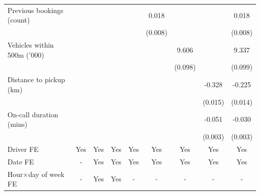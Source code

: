 \documentclass[reviewmode,AEJ]{AEA}
\begin{document}
\begin{appendices}
\begin{table}[h]
{\begin{tabular}{l*{8}{S}}
				\addlinespace
				Previous bookings (count)&                     &                     &                     &                     &       0.018 &                     &                     &       0.018 \\
				                    &                     &                     &                     &                     &     (0.008)         &                     &                     &     (0.008)         \\
				\addlinespace
				Vehicles within 500m ('000)&                     &                     &                     &                     &                     &       9.606&                     &       9.337\\
				                    &                     &                     &                     &                     &                     &     (0.098)         &                     &     (0.099)         \\
				\addlinespace
				Distance to pickup (km)&                     &                     &                     &                     &                     &                     &      -0.328&      -0.225\\
				                    &                     &                     &                     &                     &                     &                     &     (0.015)         &     (0.014)         \\
				\addlinespace
				On-call duration (mins)&                     &                     &                     &                     &                     &                     &      -0.051&      -0.030\\
				                    &                     &                     &                     &                     &                     &                     &     (0.003)         &     (0.003)         \\
				\addlinespace
				Driver FE           &       {Yes}         &       {Yes}         &       {Yes}         &       {Yes}         &       {Yes}         &       {Yes}         &       {Yes}         &       {Yes}         \\
				\addlinespace
				Date FE           &       {-}         &       {Yes}         &       {Yes}         &       {Yes}         &       {Yes}         &       {Yes}         &       {Yes}         &       {Yes}         \\
				\addlinespace
				Hour\(\times\)day of week FE&         {-}         &       {Yes}         &       {Yes}         &         {-}         &         {-}         &         {-}         &         {-}         &         {-}         \\

\end{tabular}}
\end{table}
\end{appendices}
\end{document}
